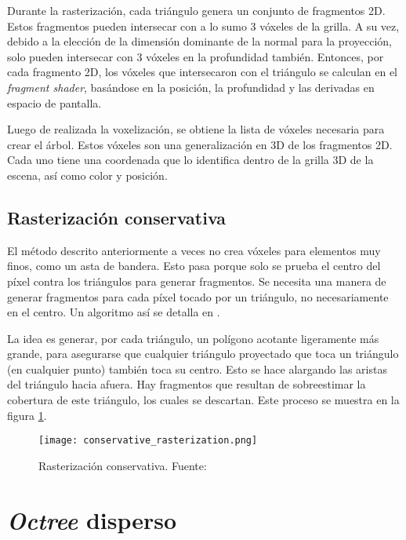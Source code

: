 Durante la rasterización, cada triángulo genera un conjunto de fragmentos 2D.
Estos fragmentos pueden intersecar con a lo sumo 3 vóxeles de la grilla. %
A su vez, debido a la elección de la dimensión dominante de la normal para la proyección, solo pueden intersecar con 3 vóxeles en la profundidad también. %
Entonces, por cada fragmento 2D, los vóxeles que intersecaron con el triángulo se calculan en el \textit{fragment shader}, basándose en la posición, la profundidad y las derivadas en espacio de pantalla. %

Luego de realizada la voxelización, se obtiene la lista de vóxeles necesaria para crear el árbol.
Estos vóxeles son una generalización en 3D de los fragmentos 2D.
Cada uno tiene una coordenada que lo identifica dentro de la grilla 3D de la escena, así como color y posición.

\subsection{Rasterización conservativa}

El método descrito anteriormente a veces no crea vóxeles para elementos muy finos, como un asta de bandera.
Esto pasa porque solo se prueba el centro del píxel contra los triángulos para generar fragmentos. %
Se necesita una manera de generar fragmentos para cada píxel tocado por un triángulo, no necesariamente en el centro.
Un algoritmo así se detalla en \cite{conservative-rasterization}.

La idea es generar, por cada triángulo, un polígono acotante ligeramente más grande, para asegurarse que cualquier triángulo proyectado que toca un triángulo (en cualquier punto) también toca su centro. %
Esto se hace alargando las aristas del triángulo hacia afuera.
Hay fragmentos que resultan de sobreestimar la cobertura de este triángulo, los cuales se descartan.
Este proceso se muestra en la figura \ref{fig:conservative_rasterization}.

\begin{figure}[h!]
    \centering
    \texttt{[image: conservative\_rasterization.png]}
    \caption{Rasterización conservativa. Fuente: \cite{opengl-insights}}
    \label{fig:conservative_rasterization}
\end{figure}

\section{\textit{Octree} disperso}


